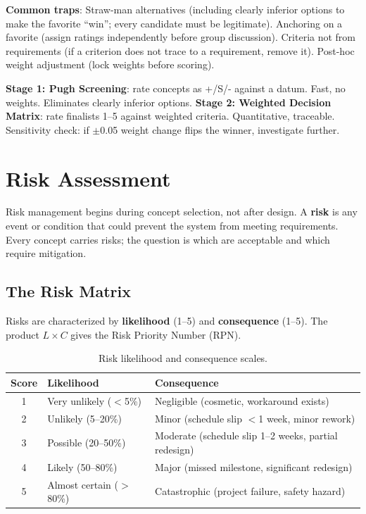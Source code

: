 \textbf{Common traps}: Straw-man alternatives (including clearly inferior options to make the favorite ``win''; every candidate must be legitimate). Anchoring on a favorite (assign ratings independently before group discussion). Criteria not from requirements (if a criterion does not trace to a requirement, remove it). Post-hoc weight adjustment (lock weights before scoring).

\textbf{Stage 1: Pugh Screening}: rate concepts as +/S/- against a datum. Fast, no weights. Eliminates clearly inferior options. \textbf{Stage 2: Weighted Decision Matrix}: rate finalists 1--5 against weighted criteria. Quantitative, traceable. Sensitivity check: if $\pm$0.05 weight change flips the winner, investigate further.


\section{Risk Assessment}
Risk management begins during concept selection, not after design. A \textbf{risk} is any event or condition that could prevent the system from meeting requirements. Every concept carries risks; the question is which are acceptable and which require mitigation.

\subsection{The Risk Matrix}
Risks are characterized by \textbf{likelihood} (1--5) and \textbf{consequence} (1--5). The product $L \times C$ gives the Risk Priority Number (RPN).

\begin{table}[htbp]\centering\small
\begin{tabularx}{\textwidth}{c X X}
\toprule
\textbf{Score} & \textbf{Likelihood} & \textbf{Consequence} \\
\midrule
1 & Very unlikely ($<$5\%) & Negligible (cosmetic, workaround exists) \\
2 & Unlikely (5--20\%) & Minor (schedule slip $<$1 week, minor rework) \\
3 & Possible (20--50\%) & Moderate (schedule slip 1--2 weeks, partial redesign) \\
4 & Likely (50--80\%) & Major (missed milestone, significant redesign) \\
5 & Almost certain ($>$80\%) & Catastrophic (project failure, safety hazard) \\
\bottomrule
\end{tabularx}
\caption{Risk likelihood and consequence scales.}
\end{table}

